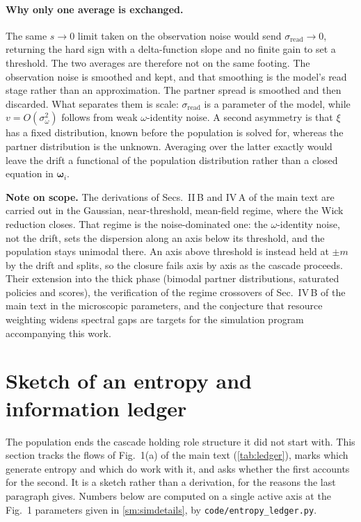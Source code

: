 \documentclass[
  aps,prx,
  preprint,
  superscriptaddress,
  nofootinbib
]{revtex4-2}
\newcommand{\w}{\bm{\omega}}
\newcommand{\sread}{\sigma_{\mathrm{read}}}
\newcommand{\sidn}{\sigma_{\omega}}
\begin{document}
\paragraph{Why only one average is exchanged.} The same $s\to0$ limit taken on the observation noise would send $\sread\to0$, returning the hard sign with a delta-function slope and no finite gain to set a threshold. The two averages are therefore not on the same footing. The observation noise is smoothed and kept, and that smoothing is the model's read stage rather than an approximation. The partner spread is smoothed and then discarded. What separates them is scale: $\sread$ is a parameter of the model, while $v=O(\sidn^2)$ follows from weak $\omega$-identity noise. A second asymmetry is that $\xi$ has a fixed distribution, known before the population is solved for, whereas the partner distribution is the unknown. Averaging over the latter exactly would leave the drift a functional of the population distribution rather than a closed equation in $\w_i$.

\noindent\textbf{Note on scope.} The derivations of Secs.~II\,B and IV\,A of the main text are carried out in the Gaussian, near-threshold, mean-field regime, where the Wick reduction closes. That regime is the noise-dominated one: the $\omega$-identity noise, not the drift, sets the dispersion along an axis below its threshold, and the population stays unimodal there. An axis above threshold is instead held at $\pm m$ by the drift and splits, so the closure fails axis by axis as the cascade proceeds. Their extension into the thick phase (bimodal partner distributions, saturated policies and scores), the verification of the regime crossovers of Sec.~IV\,B of the main text in the microscopic parameters, and the conjecture that resource weighting widens spectral gaps are targets for the simulation program accompanying this work.

\section{Sketch of an entropy and information ledger}\label{sm:thermo}

\noindent The population ends the cascade holding role structure it did not start with. This section tracks the flows of Fig.~1(a) of the main text (\cref{tab:ledger}), marks which generate entropy and which do work with it, and asks whether the first accounts for the second. It is a sketch rather than a derivation, for the reasons the last paragraph gives. Numbers below are computed on a single active axis at the Fig.~1 parameters given in \cref{sm:simdetails}, by \texttt{code/entropy\_ledger.py}.
\end{document}
